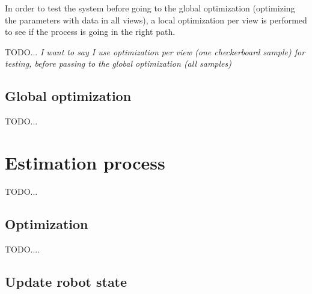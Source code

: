 In order to test the system before going to the global optimization (optimizing the parameters with data in all views), a local optimization per view is performed to see if the process is going in the right path.

TODO... \textit{I want to say I use optimization per view (one checkerboard sample) for testing, before passing to the global optimization (all samples)}



\subsection{Global optimization}

TODO...



\section{Estimation process}
\label{sec:estimation}

TODO...

%



\subsection{Optimization}




TODO....

\subsection{Update robot state}

